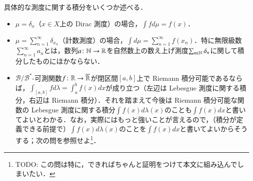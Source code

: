 \begin{exm}具体的な測度に関する積分をいくつか述べる．
\begin{itemize}
\item $\mu = \delta_x$（$x \in X$上の Dirac 測度）の場合，$\int f d \mu = f(x)$．
\item $\mu = \sum_{n=1}^\infty \delta_{x_n}$（計数測度）の場合，$\int d \mu = \sum_{n=1}^\infty f(x_n)$．特に無限級数$\sum_{n=1}^\infty a_n$とは，数列$a \colon \mathbb{N} \to \mathbb{R}$を自然数上の数え上げ測度$\sum_{n \in \mathbb{N}} \delta_n$に関して積分したものにほかならない．
\item $\mathcal{B}/\mathcal{B}^*$-可測関数$f \colon \mathbb{R} \to \overline{\mathbb{R}}$が閉区間$[a,b]$上で Riemann 積分可能であるならば，$\int_{[a,b]} f d \lambda = \int_a^b f(x) dx$が成り立つ（左辺は Lebesgue 測度に関する積分，右辺は Riemann 積分）．それを踏まえて今後は Riemann 積分可能な関数の Lebesgue 測度に関する積分$\int f(x) d \lambda(x)$のことも$\int f(x)dx$と書いてよいとわかる．なお，実際にはもっと強いことが言えるので，（積分が定義できる前提で）$\int f(x) d \lambda(x)$のことを$\int f(x)dx$と書いてよいからそうする；次の問を参照せよ\footnote{TODO: この問は特に，できればちゃんと証明をつけて本文に組み込んでしまいたい．}．
\end{itemize}
\end{exm}

